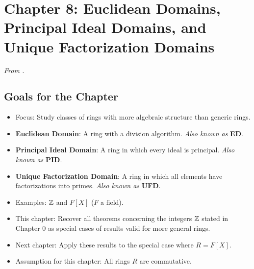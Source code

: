 \documentclass[../notes.tex]{subfiles}
\begin{document}
\section{Chapter 8: Euclidean Domains, Principal Ideal Domains, and Unique Factorization Domains}
\emph{From \textcite{bib:DummitFoote}.}
\subsection*{Goals for the Chapter}
\begin{itemize}
    \item {}Focus: Study classes of rings with more algebraic structure than generic rings.
    \item \textbf{Euclidean Domain}: A ring with a division algorithm. \emph{Also known as} \textbf{ED}.
    \item \textbf{Principal Ideal Domain}: A ring in which every ideal is principal. \emph{Also known as} \textbf{PID}.
    \item \textbf{Unique Factorization Domain}: A ring in which all elements have factorizations into primes. \emph{Also known as} \textbf{UFD}.
    \item Examples: $\mathbb{Z}$ and $F[X]$ ($F$ a field).
    \item This chapter: Recover all theorems concerning the integers $\mathbb{Z}$ stated in Chapter 0 as special cases of results valid for more general rings.
    \item Next chapter: Apply these results to the special case where $R=F[X]$.
    \item Assumption for this chapter: All rings $R$ are commutative.
\end{itemize}
\end{document}
